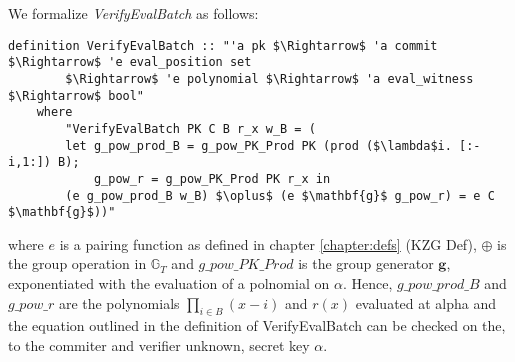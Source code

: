 We formalize \textit{VerifyEvalBatch} as follows: 
\begin{lstlisting}[language=isabelle]
    definition VerifyEvalBatch :: "'a pk $\Rightarrow$ 'a commit $\Rightarrow$ 'e eval_position set 
        $\Rightarrow$ 'e polynomial $\Rightarrow$ 'a eval_witness $\Rightarrow$ bool"
    where 
        "VerifyEvalBatch PK C B r_x w_B = (
        let g_pow_prod_B = g_pow_PK_Prod PK (prod ($\lambda$i. [:-i,1:]) B);
            g_pow_r = g_pow_PK_Prod PK r_x in
        (e g_pow_prod_B w_B) $\oplus$ (e $\mathbf{g}$ g_pow_r) = e C $\mathbf{g}$))"     
\end{lstlisting}
where $e$ is a pairing function as defined in chapter \ref{chapter:defs} (KZG Def), $\oplus$ is the group operation in $\mathbb{G}_T$ and $g\_pow\_PK\_Prod$ is the group generator $\mathbf{g}$, exponentiated with the evaluation of a polnomial on $\alpha$. Hence, $g\_pow\_prod\_B$ and $g\_pow\_r$ are the polynomials $\prod_{i\in B}^{}(x-i)$ and $r(x)$ evaluated at alpha and the equation outlined in the definition of VerifyEvalBatch can be checked on the, to the commiter and verifier unknown, secret key $\alpha$.